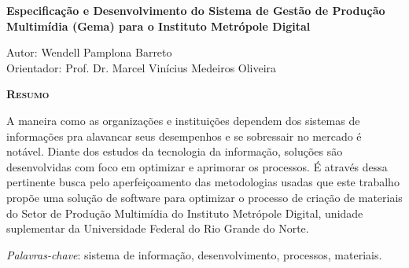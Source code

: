 \begin{center}
	{\Large{\textbf{Especificação e Desenvolvimento do Sistema de Gestão de Produção Multimídia (Gema) para o Instituto Metrópole Digital}}}
\end{center}

\vspace{1cm}

\begin{flushright}
	Autor: Wendell Pamplona Barreto\\
	Orientador: Prof. Dr. Marcel Vinícius Medeiros Oliveira
\end{flushright}

\vspace{1cm}

\begin{center}
	\Large{\textsc{\textbf{Resumo}}}
\end{center}

\noindent A maneira como as organizações e instituições dependem dos sistemas de informações pra alavancar seus desempenhos e se sobressair no mercado é notável. Diante dos estudos da tecnologia da informação, soluções são desenvolvidas com foco em optimizar e aprimorar os processos. É através dessa pertinente busca pelo aperfeiçoamento das metodologias usadas que este trabalho propõe uma solução de software para optimizar o processo de criação de materiais do Setor de Produção Multimídia do Instituto Metrópole Digital, unidade suplementar da Universidade Federal do Rio Grande do Norte.

\noindent\textit{Palavras-chave}: sistema de informação, desenvolvimento, processos, materiais.